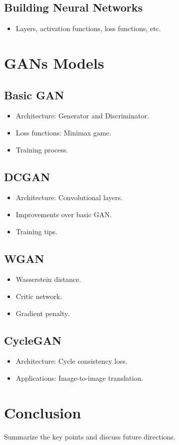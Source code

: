 \documentclass{article}
\begin{document}
\subsection{Building Neural Networks}
\begin{itemize}
    \item Layers, activation functions, loss functions, etc.
\end{itemize}

\section{GANs Models}
\label{sec:gans-models}
\subsection{Basic GAN}
\begin{itemize}
    \item Architecture: Generator and Discriminator.
    \item Loss functions: Minimax game.
    \item Training process.
\end{itemize}

\subsection{DCGAN}
\begin{itemize}
    \item Architecture: Convolutional layers.
    \item Improvements over basic GAN.
    \item Training tips.
\end{itemize}

\subsection{WGAN}
\begin{itemize}
    \item Wasserstein distance.
    \item Critic network.
    \item Gradient penalty.
\end{itemize}

\subsection{CycleGAN}
\begin{itemize}
    \item Architecture: Cycle consistency loss.
    \item Applications: Image-to-image translation.
\end{itemize}


\section{Conclusion}
\label{sec:conclusion}
Summarize the key points and discuss future directions.
\end{document}
